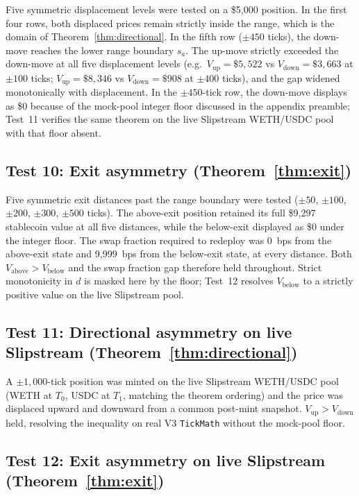 \documentclass[11pt,a4paper]{article}
\theoremstyle{plain}
\begin{document}
Five symmetric displacement levels were tested on a \$5{,}000 position. In the first four rows, both displaced prices remain strictly inside the range, which is the domain of Theorem~\ref{thm:directional}. In the fifth row ($\pm 450$ ticks), the down-move reaches the lower range boundary $s_a$. The up-move strictly exceeded the down-move at all five displacement levels (e.g.\ $V_{\text{up}} = \$5{,}522$ vs $V_{\text{down}} = \$3{,}663$ at $\pm 100$ ticks; $V_{\text{up}} = \$8{,}346$ vs $V_{\text{down}} = \$908$ at $\pm 400$ ticks), and the gap widened monotonically with displacement. In the $\pm 450$-tick row, the down-move displays as \$0 because of the mock-pool integer floor discussed in the appendix preamble; Test~11 verifies the same theorem on the live Slipstream WETH/USDC pool with that floor absent.

\subsection{Test 10: Exit asymmetry (Theorem~\ref{thm:exit})}\label{sec:foundry-exit}

Five symmetric exit distances past the range boundary were tested ($\pm 50$, $\pm 100$, $\pm 200$, $\pm 300$, $\pm 500$ ticks). The above-exit position retained its full \$9{,}297 stablecoin value at all five distances, while the below-exit displayed as \$0 under the integer floor. The swap fraction required to redeploy was 0~bps from the above-exit state and 9{,}999~bps from the below-exit state, at every distance. Both $V_{\text{above}} > V_{\text{below}}$ and the swap fraction gap therefore held throughout. Strict monotonicity in $d$ is masked here by the floor; Test~12 resolves $V_{\text{below}}$ to a strictly positive value on the live Slipstream pool.

\subsection{Test 11: Directional asymmetry on live Slipstream (Theorem~\ref{thm:directional})}\label{sec:foundry-fork-directional}

A $\pm 1{,}000$-tick position was minted on the live Slipstream WETH/USDC pool (WETH at $T_0$, USDC at $T_1$, matching the theorem ordering) and the price was displaced upward and downward from a common post-mint snapshot. $V_{\text{up}} > V_{\text{down}}$ held, resolving the inequality on real V3 \texttt{TickMath} without the mock-pool floor.

\subsection{Test 12: Exit asymmetry on live Slipstream (Theorem~\ref{thm:exit})}\label{sec:foundry-fork-exit}
\end{document}
